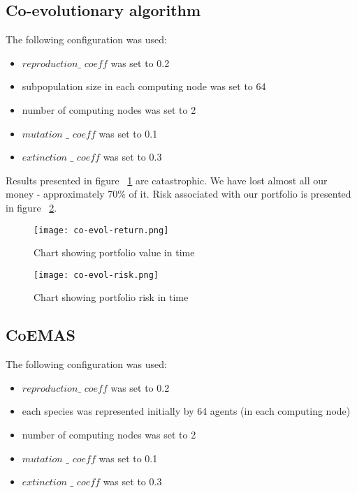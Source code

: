 \subsection{Co-evolutionary algorithm}

The following configuration was used:
\begin{itemize}
  \item $reproduction\_$ $coeff$ was set to 0.2
  \item subpopulation size in each computing node was set to 64
  \item number of computing nodes was set to 2
  \item $mutation$ $\_$ $coeff$ was set to 0.1
  \item $extinction$ $\_$ $coeff$ was set to 0.3
\end{itemize}

Results presented in figure ~\ref{fig:co_evol_return} are catastrophic.
We have lost almost all our money - approximately 70\% of it.
Risk associated with our portfolio is presented in figure ~\ref{fig:co-evol-risk}.

\begin{figure}[ht]
  \begin{center}
    \texttt{[image: co-evol-return.png]}
  \end{center}
  \caption{Chart showing portfolio value in time}
  \label{fig:co_evol_return}
\end{figure}

\begin{figure}[ht]
  \begin{center}
    \texttt{[image: co-evol-risk.png]}
  \end{center}
  \caption{Chart showing portfolio risk in time}
  \label{fig:co-evol-risk}
\end{figure}


\subsection{CoEMAS}

The following configuration was used:
\begin{itemize}
  \item $reproduction\_$ $coeff$ was set to 0.2
  \item each species was represented initially by 64 agents (in each computing node)
  \item number of computing nodes was set to 2
  \item $mutation$ $\_$ $coeff$ was set to 0.1
  \item $extinction$ $\_$ $coeff$ was set to 0.3
\end{itemize}

